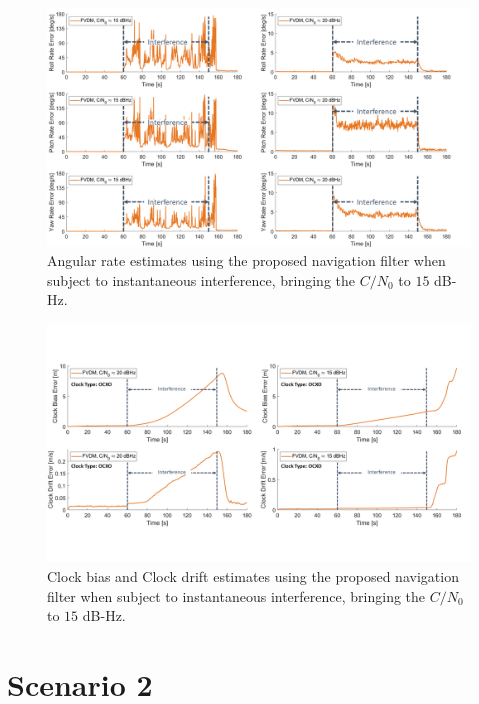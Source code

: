 \begin{figure}[!ht]
    \centering
    \includegraphics[width=\linewidth]{Figures/doubleresults/Slide2.PNG}
    \caption{Angular rate estimates using the proposed navigation filter when subject to instantaneous interference, bringing the \(C/N_0\) to \(15\) dB-Hz.}\label{fig:Ang15}
\end{figure}


\begin{figure}[!ht]
    \centering
    \includegraphics[width=\linewidth]{Figures/doubleresults/Slide4.PNG}
    \caption{Clock bias and Clock drift estimates using the proposed navigation filter when subject to instantaneous interference, bringing the \(C/N_0\) to \(15\) dB-Hz.}\label{fig:Clk1520}
\end{figure}



\clearpage

\section{\textbf{Scenario 2}}

